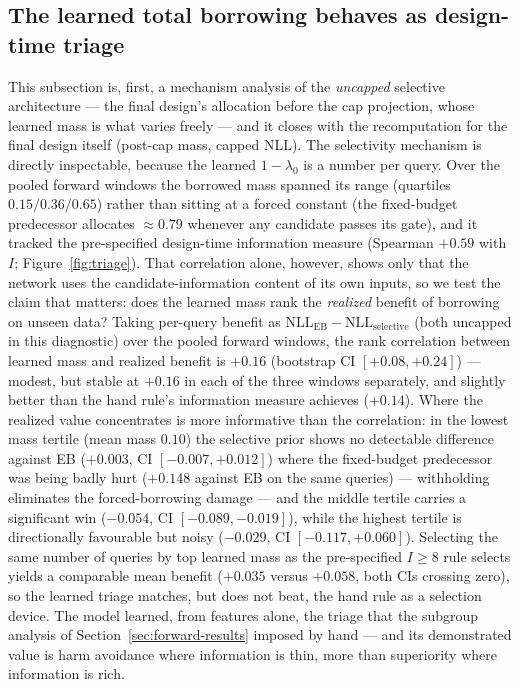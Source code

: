 \documentclass[11pt]{article}
\newcommand{\lamz}{\lambda_{0}}
\begin{document}
\subsection{The learned total borrowing behaves as design-time triage}
\label{sec:triage-results}
This subsection is, first, a mechanism analysis of the \emph{uncapped}
selective architecture --- the final design's allocation before the cap
projection, whose learned mass is what varies freely --- and it closes
with the recomputation for the final design itself (post-cap mass,
capped NLL). The selectivity mechanism is directly inspectable, because the learned
$1-\lamz$ is a number per query. Over the pooled forward windows the borrowed
mass spanned its range (quartiles $0.15/0.36/0.65$) rather than sitting at a
forced constant (the fixed-budget predecessor allocates $\approx 0.79$
whenever any candidate passes its gate), and it tracked the pre-specified
design-time information measure (Spearman $+0.59$ with $I$;
Figure~\ref{fig:triage}). That correlation alone, however, shows only that
the network uses the candidate-information content of its own inputs, so we
test the claim that matters: does the learned mass rank the \emph{realized}
benefit of borrowing on unseen data? Taking per-query benefit as
$\mathrm{NLL}_{\mathrm{EB}} - \mathrm{NLL}_{\mathrm{selective}}$ (both
uncapped in this diagnostic) over the
pooled forward windows, the rank correlation between learned mass and
realized benefit is $+0.16$ (bootstrap CI $[+0.08, +0.24]$) --- modest, but
stable at $+0.16$ in each of the three windows separately, and slightly
better than the hand rule's information measure achieves ($+0.14$).
Where the realized value concentrates is more informative than the
correlation: in the lowest mass tertile (mean mass $0.10$) the selective
prior shows no detectable difference against EB ($+0.003$, CI $[-0.007,+0.012]$) where
the fixed-budget predecessor was being badly hurt ($+0.148$ against EB on the
same queries) --- withholding eliminates the forced-borrowing damage --- and
the middle tertile carries a significant win ($-0.054$, CI
$[-0.089,-0.019]$), while the highest tertile is directionally favourable
but noisy ($-0.029$, CI $[-0.117,+0.060]$). Selecting the same number of
queries by top learned mass as the pre-specified $I \ge 8$ rule selects
yields a comparable mean benefit ($+0.035$ versus $+0.058$, both CIs
crossing zero), so the learned triage matches, but does not beat, the hand
rule as a selection device. The model learned, from features alone, the
triage that the subgroup analysis of Section~\ref{sec:forward-results}
imposed by hand --- and its demonstrated value is harm avoidance where
information is thin, more than superiority where information is rich.
\end{document}
